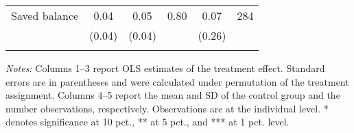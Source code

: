 \begin{table}[h]
{\begin{threeparttable}
\begin{tabular}{l*{5}{c}}
Saved balance&     0.04&     0.05&     0.80&     0.07&      284\\
          &   (0.04)&   (0.04)&         &   (0.26)&         \\
          &         &         &         &         &         \\
\bottomrule \end{tabular} \begin{tablenotes}[flushleft] \footnotesize \item \emph{Notes:} Columns 1--3 report OLS estimates of the treatment effect. Standard errors are in parentheses and were calculated under permutation of the treatment assignment. Columns 4--5 report the mean and SD of the control group and the number observations, respectively. Observations are at the individual level. * denotes significance at 10 pct., ** at 5 pct., and *** at 1 pct. level. \end{tablenotes} \end{threeparttable} } \end{table}

